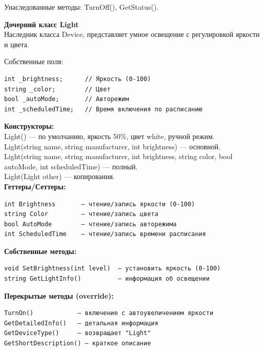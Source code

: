 \documentclass[oneside,a4paper,14pt]{extarticle}
\begin{document}
Унаследованные методы: TurnOff(), GetStatus().

\newpage

\textbf{Дочерний класс Light}\\

Наследник класса Device, представляет умное освещение с регулировкой яркости и цвета.

Собственные поля:

\begin{verbatim}
int _brightness;      // Яркость (0-100)
string _color;        // Цвет
bool _autoMode;       // Авторежим
int _scheduledTime;   // Время включения по расписанию
\end{verbatim}

\textbf{Конструкторы:}\\

Light() — по умолчанию, яркость 50\%, цвет white, ручной режим.\\

Light(string name, string manufacturer, int brightness) — основной.\\

Light(string name, string manufacturer, int brightness, string color, bool autoMode, int scheduledTime) — полный.\\

Light(Light other) — копирования.\\

\textbf{Геттеры/Сеттеры:}

\begin{verbatim}
int Brightness       — чтение/запись яркости (0-100)
string Color         — чтение/запись цвета
bool AutoMode        — чтение/запись авторежима
int ScheduledTime    — чтение/запись времени расписания
\end{verbatim}

\textbf{Собственные методы:}

\begin{verbatim}
void SetBrightness(int level)  — установить яркость (0-100)
string GetLightInfo()          — информация об освещении
\end{verbatim}

\textbf{Перекрытые методы (override):}

\begin{verbatim}
TurnOn()            — включение с автоувеличением яркости
GetDetailedInfo()   — детальная информация
GetDeviceType()     — возвращает "Light"
GetShortDescription() — краткое описание
\end{verbatim}
\end{document}
